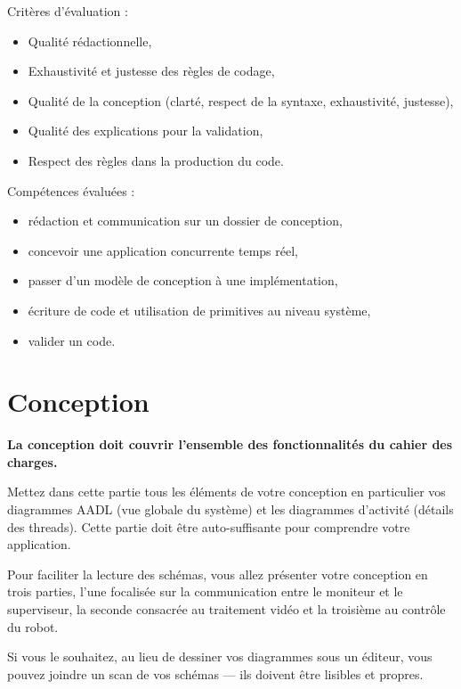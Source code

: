 \documentclass[11pt, a4paper]{paper}
\begin{document}
{\begin{framed}
Critères d'évaluation :
\begin{itemize}
	\item Qualité rédactionnelle,
	\item Exhaustivité et justesse des règles de codage,
	\item Qualité de la conception (clarté, respect de la syntaxe, exhaustivité, justesse),
	\item Qualité des explications pour la validation,
	\item Respect des règles dans la production du code.\\
\end{itemize}

Compétences évaluées :
\begin{itemize}
	\item rédaction et communication sur un dossier de conception,
	\item concevoir une application concurrente temps réel,
	\item passer d'un modèle de conception à une implémentation,
	\item écriture de code et utilisation de primitives au niveau système,
	\item valider un code.
\end{itemize}
\end{framed}
}

\newpage




\section{Conception}

{\color{red} {\bf La conception doit couvrir l'ensemble des fonctionnalités du cahier des charges.}

Mettez dans cette partie tous les éléments de votre conception en particulier vos diagrammes AADL (vue globale du système) et les diagrammes d'activité (détails des threads). Cette partie doit être auto-suffisante pour comprendre votre application.

Pour faciliter la lecture des schémas, vous allez présenter votre conception en trois parties, l'une focalisée sur la communication entre le moniteur et le superviseur, la seconde consacrée au traitement vidéo et la troisième au contrôle du robot.

Si vous le souhaitez, au lieu de dessiner vos diagrammes sous un éditeur, vous pouvez joindre un scan de vos schémas — ils doivent être lisibles et propres.}
\end{document}
